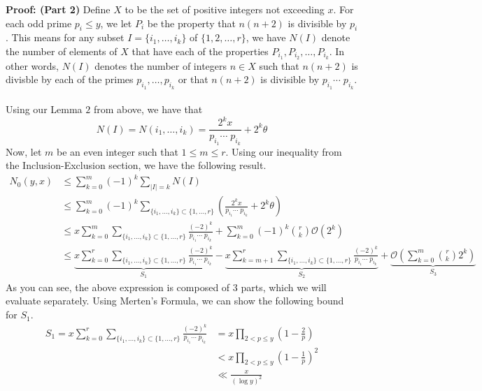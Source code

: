 \documentclass[8pt]{extarticle}
\begin{document}
\begin{boxedsection}
    \textbf{Proof: (Part 2)} Define $X$ to be the set of positive integers not exceeding $x$. 
    For each odd prime $p_i \leq y$, we let $P_i$ be the property that $n(n+2)$ is divisible by $p_i$. This means for any subset $I = \{i_1, \dots, i_k\}$ of $\{1,2,\dots,r\}$, we have $N(I)$ denote the number of elements of $X$ that have each of the properties $P_{i_1}, P_{i_2}, \dots, P_{i_k}$. In other words, $N(I)$ denotes the number of integers $n \in X$ 
    such that $n(n+2)$ is divisble by each of the primes $p_{i_1}, \dots, p_{i_k}$ or that $n(n+2)$ is divisible by $p_{i_1}\cdots\; p_{i_k}$.\\
    \\
    Using our Lemma $2$ from above, we have that 
    $$
    N(I) = N(i_1, \dots, i_k) = \frac{2^k x}{p_{i_1} \cdots\; p_{i_k}} + 2^k\theta
    $$
    Now, let $m$ be an even integer such that $1 \leq m \leq r$. Using our inequality from the Inclusion-Exclusion section, we have the following result.
    \begin{align*}
        N_0(y,x) &\leq \sum_{k=0}^m (-1)^k \sum_{|I| = k} N(I)\\
        &\leq \sum_{k=0}^m (-1)^k \sum_{\{i_1, \dots, i_k\} \subset \{1,\dots,r\}} \left(\frac{2^k x}{p_{i_1} \cdots \;p_{i_k}} + 2^k\theta\right)\\
        &\leq x \sum_{k=0}^m \sum_{\{i_1, \dots, i_k\} \subset \{1,\dots,r\}} \frac{(-2)^k}{p_{i_1} \cdots \;p_{i_k}} + \sum_{k=0}^m (-1)^k {r \choose k} \mathcal{O}(2^k)\\
        &\leq \underbrace{x \sum_{k=0}^r \sum_{\{i_1, \dots, i_k\} \subset \{1,\dots,r\}} \frac{(-2)^k}{p_{i_1} \cdots \;p_{i_k}}}_{S_1} - \underbrace{x \sum_{k=m+1}^r \sum_{\{i_1, \dots, i_k\} \subset \{1,\dots,r\}} \frac{(-2)^k}{p_{i_1} \cdots \;p_{i_k}}}_{S_2} + \underbrace{\mathcal{O}\left(\sum_{k=0}^m {r \choose k} 2^k\right)}_{S_3}
    \end{align*}
    As you can see, the above expression is composed of $3$ parts, which we will evaluate separately. Using Merten's Formula, we can show the following bound for $S_1$.
    \begin{align*}
        S_1 = x \sum_{k=0}^r \sum_{\{i_1, \dots, i_k\} \subset \{1,\dots,r\}} \frac{(-2)^k}{p_{i_1} \cdots \;p_{i_k}} &= x \prod_{2 < p \leq y} \left(1- \frac{2}{p}\right)\\
        &< x \prod_{2 < p \leq y} \left(1- \frac{1}{p}\right)^2\\
        &\ll \frac{x}{(\log y)^2}
    \end{align*}

\end{boxedsection}
\end{document}
